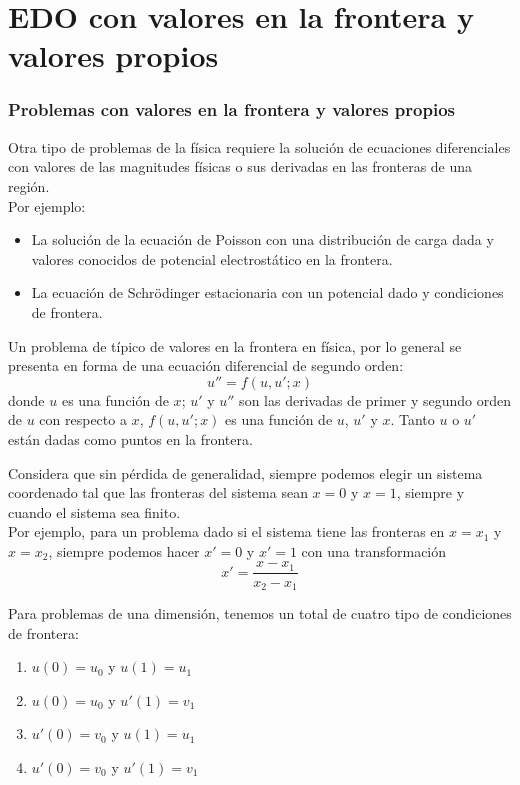 \section{EDO con valores en la frontera y valores propios}
\begin{frame}
\frametitle{Problemas con valores en la frontera y valores propios}
Otra tipo de problemas de la física requiere la solución de ecuaciones diferenciales con valores de las magnitudes físicas o sus derivadas en las fronteras de una región.
\\
\medskip
\pause
Por ejemplo:
\begin{itemize}
\item La solución de la ecuación de Poisson con una  distribución de carga dada y valores conocidos de potencial electrostático en la frontera.
\item La ecuación de Schrödinger estacionaria con un potencial dado y  
condiciones de frontera.
\end{itemize}
\end{frame}
\begin{frame}
Un problema de típico de valores en la frontera en física, por lo general se presenta en forma de una ecuación diferencial de segundo orden:
\begin{equation}
u'' = f(u, u';x)
\label{eq:ecuacion1}
\end{equation} 
donde $u$ es una función de $x$; $u'$ y $u''$ son las derivadas de primer y segundo orden de $u$ con respecto a $x$, $f(u,u';x)$ es una función de $u$, $u'$ y $x$. Tanto $u$ o $u'$ están dadas como puntos en la frontera.
\end{frame}
\begin{frame}
Considera que sin pérdida de generalidad, siempre podemos elegir un sistema coordenado tal que las fronteras del sistema sean $x=0$ y $x=1$, siempre y cuando el sistema sea finito.
\\
\medskip
Por ejemplo, para un problema dado si el sistema tiene las fronteras en $x=x_{1}$ y $x=x_{2}$, siempre podemos hacer $x'=0$ y $x'=1$ con una transformación
\begin{equation}
x' = \dfrac{x-x_{1}}{x_{2} - x_{1}}
\end{equation} 
\end{frame}
\begin{frame}
Para problemas de una dimensión, tenemos un total de cuatro tipo de condiciones de frontera:
\begin{enumerate}
\item $u(0) = u_{0}$ y $u(1) = u_{1}$ 
\item $u(0) = u_{0}$ y $u'(1) = v_{1}$
\item $u'(0) = v_{0}$ y $u(1) = u_{1}$
\item $u'(0) = v_{0}$ y $u'(1) = v_{1}$   
\end{enumerate}
\end{frame}

